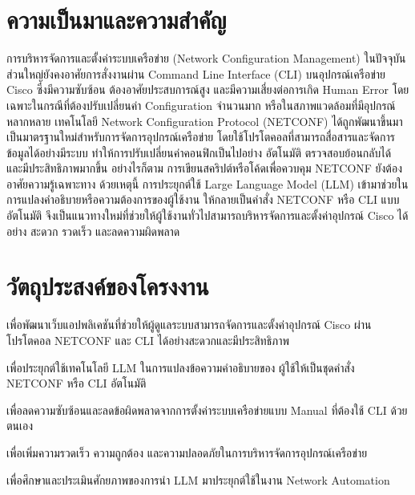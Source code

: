 
\section{ความเป็นมาและความสำคัญ} 

\hspace*{1.3em} %
การบริหารจัดการและตั้งค่าระบบเครือข่าย (Network Configuration Management)
ในปัจจุบัน ส่วนใหญ่ยังคงอาศัยการสั่งงานผ่าน Command Line Interface (CLI) บนอุปกรณ์เครือข่าย Cisco ซึ่งมีความซับซ้อน ต้องอาศัยประสบการณ์สูง และมีความเสี่ยงต่อการเกิด Human Error โดยเฉพาะในกรณีที่ต้องปรับเปลี่ยนค่า Configuration จำนวนมาก หรือในสภาพแวดล้อมที่มีอุปกรณ์หลากหลาย
เทคโนโลยี Network Configuration Protocol (NETCONF) ได้ถูกพัฒนาขึ้นมาเป็นมาตรฐานใหม่สำหรับการจัดการอุปกรณ์เครือข่าย โดยใช้โปรโตคอลที่สามารถสื่อสารและจัดการข้อมูลได้อย่างมีระบบ ทำให้การปรับเปลี่ยนค่าคอนฟิกเป็นไปอย่าง อัตโนมัติ ตรวจสอบย้อนกลับได้ และมีประสิทธิภาพมากขึ้น อย่างไรก็ตาม การเขียนสคริปต์หรือโค้ดเพื่อควบคุม NETCONF ยังต้องอาศัยความรู้เฉพาะทาง
\hspace*{1.5em}
ด้วยเหตุนี้ การประยุกต์ใช้ Large Language Model (LLM) เข้ามาช่วยในการแปลงคำอธิบายหรือความต้องการของผู้ใช้งาน ให้กลายเป็นคำสั่ง NETCONF หรือ CLI แบบอัตโนมัติ จึงเป็นแนวทางใหม่ที่ช่วยให้ผู้ใช้งานทั่วไปสามารถบริหารจัดการและตั้งค่าอุปกรณ์ Cisco ได้อย่าง สะดวก รวดเร็ว และลดความผิดพลาด


\section{วัตถุประสงค์ของโครงงาน}

\begin{mycustomenum}[label=1.2.\arabic*] %
    \item เพื่อพัฒนาเว็บแอปพลิเคชันที่ช่วยให้ผู้ดูแลระบบสามารถจัดการและตั้งค่าอุปกรณ์ Cisco ผ่านโปรโตคอล NETCONF และ CLI ได้อย่างสะดวกและมีประสิทธิภาพ
    \item เพื่อประยุกต์ใช้เทคโนโลยี LLM ในการแปลงข้อความคำอธิบายของ ผู้ใช้ให้เป็นชุดคำสั่ง NETCONF หรือ CLI อัตโนมัติ 
    \item เพื่อลดความซับซ้อนและลดข้อผิดพลาดจากการตั้งค่าระบบเครือข่ายแบบ Manual ที่ต้องใช้ CLI ด้วยตนเอง
    \item เพื่อเพิ่มความรวดเร็ว ความถูกต้อง และความปลอดภัยในการบริหารจัดการอุปกรณ์เครือข่าย
    \item เพื่อศึกษาและประเมินศักยภาพของการนำ LLM มาประยุกต์ใช้ในงาน Network Automation 
\end{mycustomenum}



